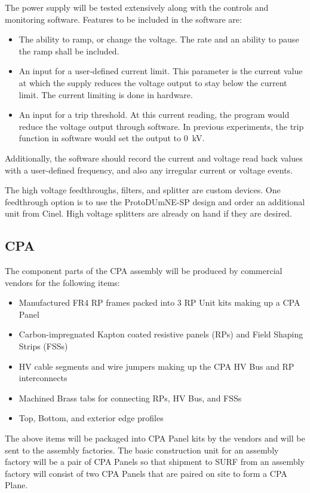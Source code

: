 The power supply will be tested extensively along with the controls and monitoring software.  Features to be included in the software are:
\begin{itemize}
\item The ability to ramp, or change the voltage.  The rate and an ability to pause the ramp shall be included.
\item An input for a user-defined current limit.  This parameter is the current value at which the supply reduces the voltage output to stay below the current limit.  The current limiting is done in hardware.
\item An input for a trip threshold.  At this current reading, the program would reduce the voltage output through software.  In previous experiments, the trip function in software would set the output to \SI{0}{kV}.
\end{itemize}
\noindent Additionally, the software should record the current and voltage read back values with a user-defined frequency, and also any irregular current or voltage events.

The high voltage feedthroughs, filters, and splitter are custom devices.  One feedthrough option is to use the ProtoDUmNE-SP design and order an additional unit from Cinel.  High voltage splitters are already on hand if they are desired.

\subsection{CPA}
\label{sec:fdsp-hv-supplies}

The component parts of the CPA assembly will be produced by commercial vendors for the following items:
\begin{itemize}
\item Manufactured FR4 RP frames packed into 3 RP Unit kits making up a CPA Panel
\item Carbon-impregnated Kapton coated resistive panels (RPs) and Field Shaping Strips (FSSs)
\item HV cable segments and wire jumpers making up the CPA HV Bus and RP interconnects
\item Machined Brass tabs for connecting RPs, HV Bus, and FSSs
\item Top, Bottom, and exterior edge profiles
\end{itemize}
The above items will be packaged into CPA Panel kits by the vendors and will be sent to the assembly factories.  The basic construction unit for an assembly factory will be a pair of CPA Panels so that shipment to SURF from an assembly factory will consist of two CPA Panels that are paired on site to form a CPA Plane.


